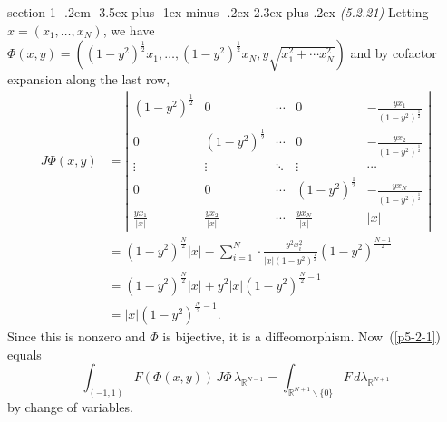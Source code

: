 \documentclass[12pt]{article}
\makeatletter
\theoremstyle{norm}
\newcommand{\R}[0]{\mathbb{R}}
\newcommand{\rc}[1]{\frac{1}{#1}}
\newcommand{\la}[0]{\lambda}
\newcommand{\bs}[0]{\backslash}
\newenvironment{problem}{\@startsection
       {section}
       {1}
       {-.2em}
       {-3.5ex plus -1ex minus -.2ex}
       {2.3ex plus .2ex}
       {\pagebreak[3]%
       \large\bf\noindent{Problem }
       }
       }
       {%
       }
\makeatother
\begin{document}
\begin{problem}{\it (5.2.21)}
Letting $x=(x_1,\ldots, x_N)$, we have $\Phi(x,y)=((1-y^2)^{\rc 2}x_1,\ldots ,(1-y^2)^{\rc 2}x_N,y\sqrt{x_1^2+\cdots x_N^2})$ and by cofactor expansion along the last row,
\begin{align*}
J\Phi(x,y)&=\left|\begin{array}{ccccc}
(1-y^{2})^{\frac{1}{2}} & 0 & \cdots & 0 & -\frac{yx_{1}}{(1-y^{2})^{\frac{1}{2}}}\\
0 & (1-y^{2})^{\frac{1}{2}} & \cdots & 0 & -\frac{yx_{2}}{(1-y^{2})^{\frac{1}{2}}}\\
\vdots & \vdots & \ddots & \vdots & \cdots\\
0 & 0 & \cdots & (1-y^{2})^{\frac{1}{2}} & -\frac{yx_{N}}{(1-y^{2})^{\frac{1}{2}}}\\
\frac{yx_{1}}{|x|} & \frac{yx_{2}}{|x|} & \cdots & \frac{yx_{N}}{|x|} & |x|\end{array}\right|\\
&=(1-y^2)^{\frac N2} |x|-\sum_{i=1}^{N} \cdot \frac{-y^2x_i^2}{|x|(1-y^2)^{\rc 2}} (1-y^2)^{\frac{N-1}{2}}\\
&=(1-y^2)^{\frac N2} |x|+y^2|x|(1-y^2)^{\frac{N}{2}-1}\\
&=|x|(1-y^2)^{\frac N2-1}.
\end{align*}
Since this is nonzero and $\Phi$ is bijective, it is a diffeomorphism. 
Now~(\ref{p5-2-1}) equals
\[
\int_{(-1,1)}F(\Phi(x,y))\,J\Phi\,\la_{\R^{N-1}}=\int_{\R^{N+1}\bs\{0\}} F\,d\la_{\R^{N+1}}
\]
by change of variables.\\


\end{problem}
\end{document}
